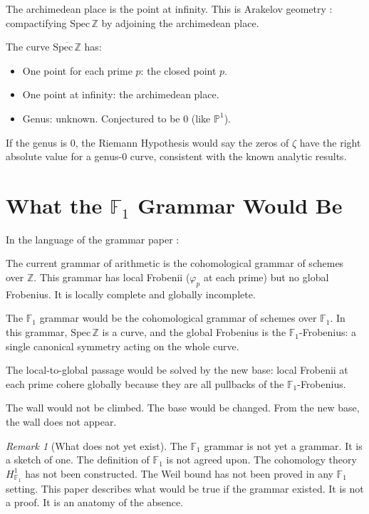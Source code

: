 \documentclass[12pt]{article}
\theoremstyle{definition}
\theoremstyle{remark}
\newtheorem{remark}[theorem]{Remark}
\begin{document}
The archimedean place is the point at infinity.
This is Arakelov geometry \cite{arakelov}:
compactifying $\mathrm{Spec}\,\mathbb{Z}$
by adjoining the archimedean place.

The curve $\overline{\mathrm{Spec}\,\mathbb{Z}}$ has:
\begin{itemize}
\item One point for each prime $p$: the closed point $p$.
\item One point at infinity: the archimedean place.
\item Genus: unknown. Conjectured to be $0$ (like $\mathbb{P}^1$).
\end{itemize}

If the genus is $0$, the Riemann Hypothesis would say the zeros of $\zeta$
have the right absolute value for a genus-$0$ curve,
consistent with the known analytic results.

\section{What the $\mathbb{F}_1$ Grammar Would Be}

In the language of the grammar paper \cite{grammar}:

The current grammar of arithmetic is the cohomological grammar
of schemes over $\mathbb{Z}$.
This grammar has local Frobenii ($\varphi_p$ at each prime)
but no global Frobenius.
It is locally complete and globally incomplete.

The $\mathbb{F}_1$ grammar would be the cohomological grammar
of schemes over $\mathbb{F}_1$.
In this grammar, $\mathrm{Spec}\,\mathbb{Z}$ is a curve,
and the global Frobenius is the $\mathbb{F}_1$-Frobenius:
a single canonical symmetry acting on the whole curve.

The local-to-global passage \cite{one_wall}
would be solved by the new base:
local Frobenii at each prime cohere globally
because they are all pullbacks of the $\mathbb{F}_1$-Frobenius.

The wall would not be climbed.
The base would be changed.
From the new base, the wall does not appear.

\begin{remark}[What does not yet exist]
The $\mathbb{F}_1$ grammar is not yet a grammar.
It is a sketch of one.
The definition of $\mathbb{F}_1$ is not agreed upon.
The cohomology theory $H^1_{\mathbb{F}_1}$ has not been constructed.
The Weil bound has not been proved in any $\mathbb{F}_1$ setting.
This paper describes what would be true if the grammar existed.
It is not a proof.
It is an anatomy of the absence.
\end{remark}
\end{document}
